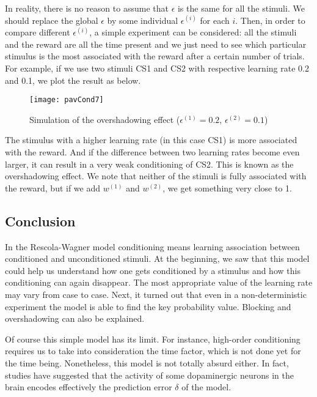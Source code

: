 In reality, there is no reason to assume that $\epsilon$ is the same for all
the stimuli. We should replace the global $\epsilon$ by some individual 
$\epsilon^{(i)}$ for each $i$. Then, in order to compare different 
$\epsilon^{(i)}$, a simple experiment can be considered: all the stimuli and 
the reward are all the time present and we just need to see which particular 
stimulus is the most associated with the reward after a certain number of 
trials. For example, if we use two stimuli CS1 and CS2 with respective 
learning rate 0.2 and 0.1, we plot the result as below.

\vspace{-1em}
\begin{figure}[H]
  \centering
  \texttt{[image: pavCond7]}
  \caption {Simulation of the overshadowing effect 
            ($\epsilon^{(1)} = 0.2$, $\epsilon^{(2)} = 0.1$)}
\end{figure}

The stimulus with a higher learning rate (in this case CS1) is more associated
with the reward. And if the difference between two learning rates become even
larger, it can result in a very weak conditioning of CS2. This is known as the 
overshadowing effect. We note that neither of the stimuli is fully associated
with the reward, but if we add $w^{(1)}$ and $w^{(2)}$, we get something very
close to 1.

\subsection{Conclusion}

In the Rescola-Wagner model conditioning means learning association between
conditioned and unconditioned stimuli. At the beginning, we saw that
this model could help us understand how one gets conditioned by a stimulus and 
how this conditioning can again disappear. The most appropriate value of the
learning rate may vary from case to case. Next, it turned out that even in a
non-deterministic experiment the model is able to find the key probability 
value. Blocking and overshadowing can also be explained. 

Of course this simple model has its limit. For instance, high-order 
conditioning requires us to take into consideration the time factor, which is
not done yet for the time being. Nonetheless, this model is not totally absurd
either. In fact, studies have suggested that the activity of some dopaminergic 
neurons in the brain encodes effectively the prediction error $\delta$ of the
model.



